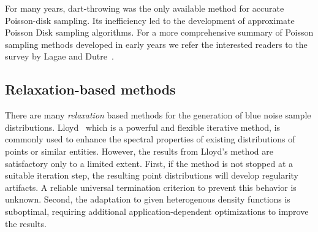 
For many years, dart-throwing was the only available method for
accurate Poisson-disk sampling. Its inefficiency led to the development
of approximate Poisson Disk sampling algorithms. For a more comprehensive summary of Poisson 
sampling methods developed in early years 
we refer the interested readers to the survey by Lagae and Dutre~\cite{journals/cgf/LagaeD08}.

\subsection{Relaxation-based methods}

There are many \emph{relaxation} based methods for the generation of blue noise sample 
distributions. 
Lloyd~\cite{Lloyd.82} 
which is a powerful and flexible iterative method, is commonly used to enhance the spectral properties of 
existing distributions of points or similar entities. However, the results from Lloyd’s method are 
satisfactory only to a limited extent. First, if the method is not stopped at a suitable iteration step, the 
resulting point distributions will develop regularity artifacts. A reliable universal termination criterion to 
prevent this behavior is unknown. Second, the adaptation to given heterogenous density functions is suboptimal, requiring additional application-dependent optimizations to improve the 
results.

